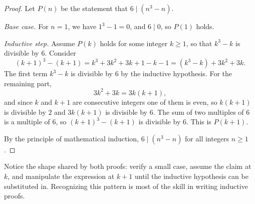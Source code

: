 \begin{proof}
Let $P(n)$ be the statement that $6 \mid (n^3 - n)$.

\emph{Base case.} For $n = 1$, we have $1^3 - 1 = 0$, and $6 \mid 0$, so $P(1)$ holds.

\emph{Inductive step.} Assume $P(k)$ holds for some integer $k \geq 1$, so that $k^3 - k$ is divisible by $6$. Consider
\[
(k+1)^3 - (k+1) = k^3 + 3k^2 + 3k + 1 - k - 1 = (k^3 - k) + 3k^2 + 3k.
\]
The first term $k^3 - k$ is divisible by $6$ by the inductive hypothesis. For the remaining part,
\[
3k^2 + 3k = 3k(k+1),
\]
and since $k$ and $k+1$ are consecutive integers one of them is even, so $k(k+1)$ is divisible by $2$ and $3k(k+1)$ is divisible by $6$. The sum of two multiples of $6$ is a multiple of $6$, so $(k+1)^3 - (k+1)$ is divisible by $6$. This is $P(k+1)$.

By the principle of mathematical induction, $6 \mid (n^3 - n)$ for all integers $n \geq 1$.
\end{proof}

\begin{remark}
Notice the shape shared by both proofs: verify a small case, assume the claim at $k$, and manipulate the expression at $k+1$ until the inductive hypothesis can be substituted in. Recognizing this pattern is most of the skill in writing inductive proofs.
\end{remark}
